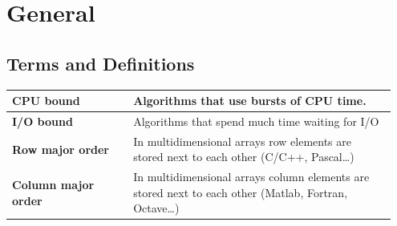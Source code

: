\section{General}
	\subsection{Terms and Definitions}
		\begin{table}[H]
			\centering
			\begin{tabular}{|>{\bfseries}p{0.3\linewidth}|p{0.65\linewidth}|}
				 \hline
				 CPU bound
				 	& Algorithms that use bursts of CPU time.\\
				 \hline
				 I/O bound  
				 	& Algorithms that spend much time waiting for I/O\\
				 \hline		
				 Row major order  
				 	& In multidimensional arrays row elements are stored next to each other (C/C++, Pascal\ldots)\\
				 \hline
				 Column major order  
				 	& In multidimensional arrays column elements are stored next to each other (Matlab, Fortran, Octave\ldots)\\
				\hline
			\end{tabular}
		\end{table}
	
